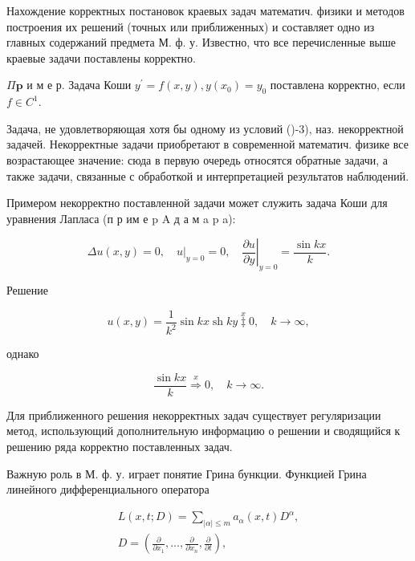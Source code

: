 \documentclass[10pt]{article}
\begin{document}
Нахождение корректных постановок краевых задач математич. физики и методов построения их решений (точных или приближенных) и составляет одно из главных содержаний предмета М. ф. у. Известно, что все перечисленные выше краевые задачи поставлены корректно.



$\Pi \mathbf{p}$ и м е р. Задача Коши $y^{\prime}=f(x, y), y\left(x_{0}\right)=y_{0}$ поставлена корректно, если $f \in C^{1}$.



Задача, не удовлетворяющая хотя бы одному из условий ()-3), наз. некорректной задачей. Некорректные задачи приобретают в современной математич. физике все возрастающее значение: сюда в первую очередь относятся обратные задачи, а также задачи, связанные с обработкой и интерпретацией результатов наблюдений.



Примером некорректно поставленной задачи может служить задача Коши для уравнения Лапласа (п р им е p A д а м a p a):



\[

\Delta u(x, y)=0,\left.\quad u\right|_{y=0}=0,\left.\quad \frac{\partial u}{\partial y}\right|_{y=0}=\frac{\sin k x}{k} .

\]



Решение



\[

u(x, y)=\frac{1}{k^{2}} \sin k x \operatorname{sh} k y \stackrel{x}{\ddagger} 0, \quad k \longrightarrow \infty,

\]



однако



\[

\frac{\sin k x}{k} \stackrel{x}{\Rightarrow} 0, \quad k \rightarrow \infty .

\]



Для приближенного решения некорректных задач существует регуляризации метод, использующий дополнительную информацию о решении и сводящийся к решению ряда корректно поставленных задач.



Важную роль в М. ф. у. играет понятие Грина бункции. Функцией Грина линейного дифференциального оператора



\[

\begin{gathered}

L(x, t ; D)=\sum_{|\alpha| \leqslant m} a_{\alpha}(x, t) D^{\alpha}, \\

D=\left(\frac{\partial}{\partial x_{1}}, \ldots, \frac{\partial}{\partial x_{n}}, \frac{\partial}{\partial t}\right),

\end{gathered}

\]
\end{document}
